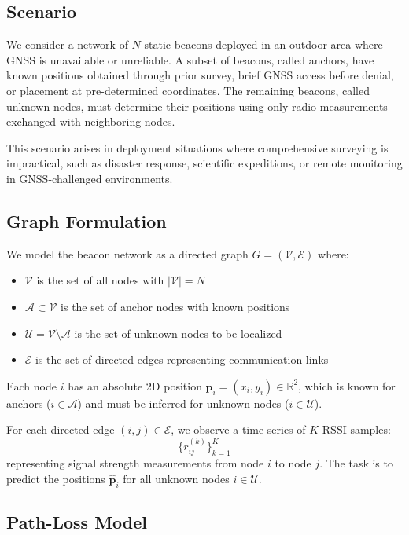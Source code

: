 \documentclass[master,final,11pt]{iscs-thesis}
\begin{document}
\subsection{Scenario}

We consider a network of $N$ static beacons deployed in an outdoor area where GNSS is unavailable or unreliable.
A subset of beacons, called anchors, have known positions obtained through prior survey, brief GNSS access before denial, or placement at pre-determined coordinates.
The remaining beacons, called unknown nodes, must determine their positions using only radio measurements exchanged with neighboring nodes.

This scenario arises in deployment situations where comprehensive surveying is impractical, such as disaster response, scientific expeditions, or remote monitoring in GNSS-challenged environments.

\subsection{Graph Formulation}

We model the beacon network as a directed graph $G = (\mathcal{V}, \mathcal{E})$ where:
\begin{itemize}
    \item $\mathcal{V}$ is the set of all nodes with $|\mathcal{V}| = N$
    \item $\mathcal{A} \subset \mathcal{V}$ is the set of anchor nodes with known positions
    \item $\mathcal{U} = \mathcal{V} \setminus \mathcal{A}$ is the set of unknown nodes to be localized
    \item $\mathcal{E}$ is the set of directed edges representing communication links
\end{itemize}

Each node $i$ has an absolute 2D position $\mathbf{p}_i = (x_i, y_i) \in \mathbb{R}^2$, which is known for anchors ($i \in \mathcal{A}$) and must be inferred for unknown nodes ($i \in \mathcal{U}$).

For each directed edge $(i, j) \in \mathcal{E}$, we observe a time series of $K$ RSSI samples:
\begin{equation}
    \{r_{ij}^{(k)}\}_{k=1}^{K}
\end{equation}
representing signal strength measurements from node $i$ to node $j$.
The task is to predict the positions $\hat{\mathbf{p}}_i$ for all unknown nodes $i \in \mathcal{U}$.

\subsection{Path-Loss Model}
\end{document}
